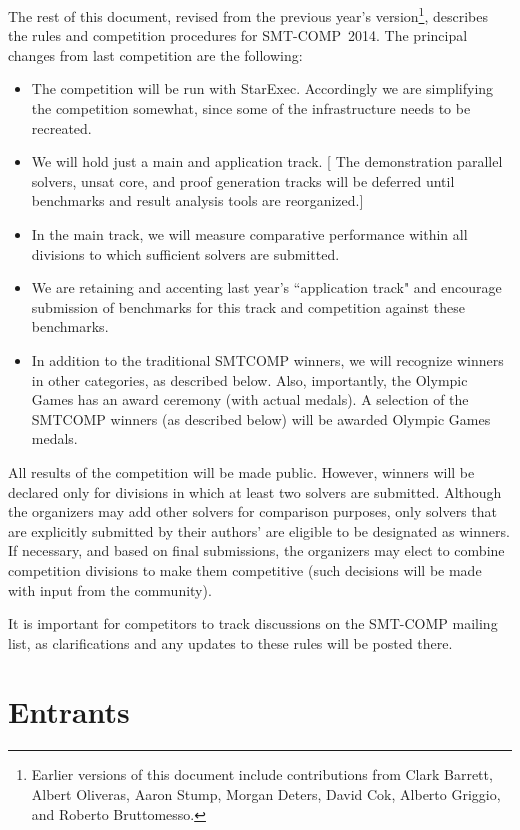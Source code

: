 \documentclass[12pt]{article}
\begin{document}
The rest of this document, revised from the previous year's
version\footnote{Earlier versions of this document include contributions from
Clark Barrett, Albert Oliveras, Aaron Stump, Morgan Deters, David Cok, Alberto Griggio, and Roberto Bruttomesso.},
describes the rules and competition procedures for SMT-COMP~2014.
The principal changes from last competition are the following:
\begin{itemize}
\item The competition will be run with StarExec. Accordingly we are simplifying the competition somewhat, since some of the infrastructure needs to be recreated.
\item We will hold just a main and application track. [ The demonstration parallel solvers, unsat core, and proof generation tracks will be deferred until benchmarks and result analysis tools are reorganized.]
\item In the main track, we will measure comparative performance within all divisions to which sufficient solvers are submitted.

\item We are retaining and accenting last year's ``application track" and
  encourage submission of benchmarks for this track and competition against these
  benchmarks.

\item In addition to the traditional SMTCOMP winners, we will recognize winners in other categories, as described below. 
Also, importantly, the Olympic Games has an award ceremony (with actual medals). A selection of the SMTCOMP winners (as described below) will be awarded Olympic Games medals.

\end{itemize}

All results of the competition will be made public. However, 
winners will be declared only for divisions in which at least two solvers are submitted.
Although the organizers may add other solvers for comparison purposes, only solvers that
are explicitly submitted by their authors' are eligible to be designated as winners.
If necessary, and based on final submissions, the organizers may elect to
combine competition divisions to make them competitive (such decisions will
be made with input from the community).

It is important for competitors to track discussions on the SMT-COMP mailing
list, as clarifications and any updates to these rules will be posted there.

\section{Entrants}
\label{sec:entrants}
\end{document}
